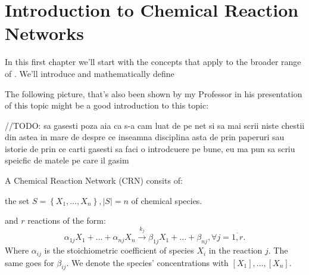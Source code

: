 \chapter{Introduction to Chemical Reaction Networks}\label{chap:ch1}

In this first chapter we'll start with the concepts that apply to the broader range of . We'll introduce and mathematically define

The following picture, that's also been shown by my Professor in his presentation of this topic might be a good introduction to this topic:

\hfill\break
//TODO: sa gasesti poza aia ca s-a cam luat de pe net
si sa mai scrii niste chestii din astea in mare de despre ce inseamna disciplina asta de prin paperuri sau istorie de prin ce carti gasesti sa faci o introdcuere pe bune, eu ma pun sa scriu speicfic de matele pe care il gasim
\hfill\break

A Chemical Reaction Network (CRN) consits of:

the set $S = \left\{ X_1, \dots, X_n \right\}, \left| S \right| = n$ of chemical species.

and $r$ reactions of the form:
\[
	\alpha_{1j} X_1 + \dots + \alpha_{n j} X_n \xrightarrow{k_j} \beta_{1j} X_1 + \dots + \beta_{n j}, \forall j = \overline{1,r}.
\]
Where $\alpha_{ij}$ is the stoichiometric coefficient of species $X_i$ in the reaction $j$.
The same goes for $\beta_{ij}$.
We denote the species' concentrations with $[X_1], \dots, [X_n]$.